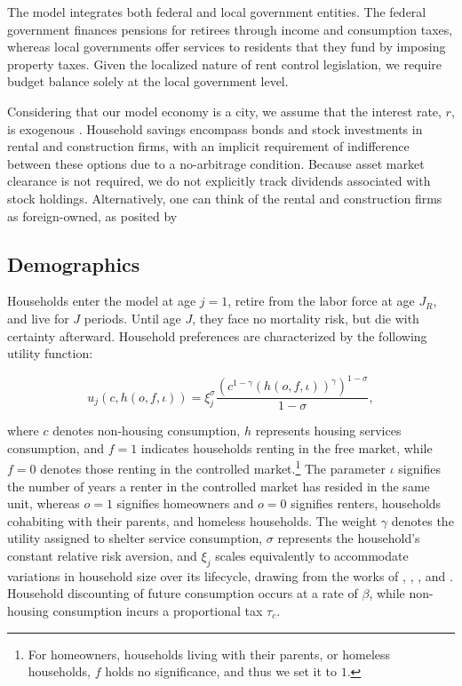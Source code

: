 \documentclass[parskip=full]{article}
\begin{document}
The model integrates both federal and local government entities. The federal government finances pensions for retirees through income and consumption taxes, whereas local governments offer services to residents that they fund by imposing property taxes. Given the localized nature of rent control legislation, we require budget balance solely at the local government level.

Considering that our model economy is a city, we assume that the interest rate, $r$, is exogenous \citep{sommeretal-2013, arslanetal-2015, sommersullivan-2017, kaplanetal-2019}. Household savings encompass bonds and stock investments in rental and construction firms, with an implicit requirement of indifference between these options due to a no-arbitrage condition. Because asset market clearance is not required, we do not explicitly track dividends associated with stock holdings. Alternatively, one can think of the rental and construction firms as foreign-owned, as posited by \citet{floettotetal-2016}

\subsection{Demographics}\label{subsection:demographics}

Households enter the model at age $j=1$, retire from the labor force at age $J_{R}$, and live for $J$ periods. Until age $J$, they face no mortality risk, but die with certainty afterward. Household preferences are characterized by the following utility function:

\begin{equation*}
    u_{j}(c,h(o,f,\iota))=\xi_{j}^{\sigma}\frac{\left(c^{1-\gamma} \left(h(o,f,\iota) \right)^{\gamma}\right)^{1-\sigma}}{1-\sigma},
\end{equation*}

\noindent where $c$ denotes non-housing consumption, $h$ represents housing services consumption, and $f=1$ indicates households renting in the free market, while $f=0$ denotes those renting in the controlled market.\footnote{For homeowners, households living with their parents, or homeless households, $f$ holds no significance, and thus we set it to $1$.} The parameter $\iota$ signifies the number of years a renter in the controlled market has resided in the same unit, whereas $o=1$ signifies homeowners and $o=0$ signifies renters, households cohabiting with their parents, and homeless households. The weight $\gamma$ denotes the utility assigned to shelter service consumption, $\sigma$ represents the household's constant relative risk aversion, and $\xi_{j}$ scales equivalently to accommodate variations in household size over its lifecycle, drawing from the works of \citet{lm-1980}, \citet{wz-2010}, \citet{xu-2013}, and \citet{rs-2023}. Household discounting of future consumption occurs at a rate of $\beta$, while non-housing consumption incurs a proportional tax $\tau_{c}$.
\end{document}
